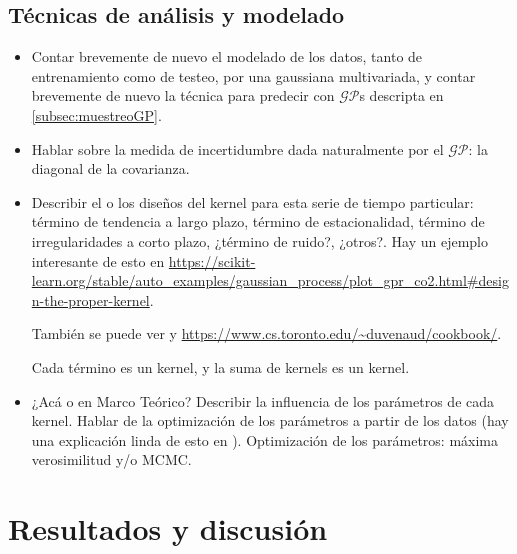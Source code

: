 \documentclass[a4paper]{article}
\newcommand{\gp}{\ensuremath{\mathcal{GP}}}
\begin{document}
\subsection{Técnicas de análisis y modelado}
\begin{itemize}
	\item Contar brevemente de nuevo el modelado de los datos, tanto de entrenamiento como de testeo, por una gaussiana multivariada, y contar brevemente de nuevo la técnica para predecir con $\gp$s descripta en \ref{subsec:muestreoGP}.
	
	\item Hablar sobre la medida de incertidumbre dada naturalmente por el $\gp$: la diagonal de la covarianza.
	
	\item Describir el o los diseños del kernel para esta serie de tiempo particular: término de tendencia a largo plazo, término de estacionalidad, término de irregularidades a corto plazo, ¿término de ruido?, ¿otros?. Hay un ejemplo interesante de esto en \url{https://scikit-learn.org/stable/auto_examples/gaussian_process/plot_gpr_co2.html#design-the-proper-kernel}.
	
	También se puede ver \cite{tesisduvenaud} y \url{https://www.cs.toronto.edu/~duvenaud/cookbook/}.
	
	Cada término es un kernel, y la suma de kernels es un kernel.
	
	\item ¿Acá o en Marco Teórico? Describir la influencia de los parámetros de cada kernel. Hablar de la optimización de los parámetros a partir de los datos (hay una explicación linda de esto en \cite{tobar}). Optimización de los parámetros: máxima verosimilitud y/o MCMC.
\end{itemize}



\section{Resultados y discusión}
\end{document}
